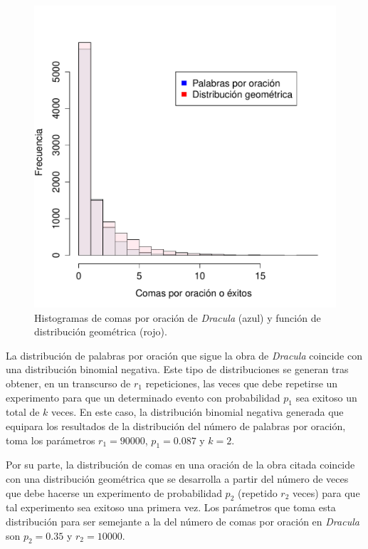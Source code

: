 \documentclass[paper=leter, fontsize=11pt]{scrartcl}
\numberwithin{equation}{section}		%
\numberwithin{figure}{section}			%
\numberwithin{table}{section}				%
\begin{document}
\begin{figure}
    \centering
    \includegraphics[width=1\textwidth]{comas.pdf}
    \caption{Histogramas de comas por oración de \textit{Dracula} (azul) y función de distribución geométrica (rojo).}
    \label{comas}
\end{figure}

La distribución de palabras por oración que sigue la obra de \textit{Dracula} coincide con una distribución binomial negativa. Este tipo de distribuciones se generan tras obtener, en un transcurso de $r_1$ repeticiones, las veces que debe repetirse un experimento para que un determinado evento con probabilidad $p_1$ sea exitoso un total de $k$ veces. En este caso, la distribución binomial negativa generada que equipara los resultados de la distribución del número de palabras por oración, toma los parámetros $r_1 = 90000$, $p_1 = 0.087$ y $k = 2$.

Por su parte, la distribución de comas en una oración de la obra citada coincide con una distribución geométrica que se desarrolla a partir del número de veces que debe hacerse un experimento de probabilidad $p_2$ (repetido $r_2$ veces) para que tal experimento sea exitoso una primera vez. Los parámetros que toma esta distribución para ser semejante a la del número de comas por oración en \textit{Dracula} son $p_2 = 0.35$ y $r_2 = 10000$.



\end{document}

